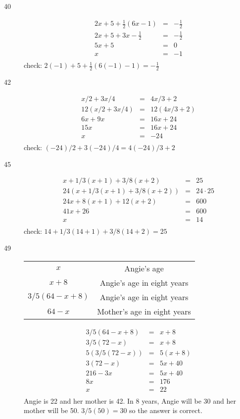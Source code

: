 \documentclass{exam}
\begin{document}
\begin{description}
\item[40]
\begin{eqnarray*}
  2x + 5 + \frac{1}{2}(6x - 1) & = & -\frac{1}{2} \\
  2x + 5 + 3x - \frac{1}{2} & = & -\frac{1}{2} \\
  5x + 5 & = & 0 \\
  x & = & -1 \\
\end{eqnarray*}
check: \( 2(-1) + 5 + \frac{1}{2}(6(-1) - 1) = -\frac{1}{2} \)

\item[42]
\begin{eqnarray*}
  x/2 + 3x/4 & = & 4x/3 + 2 \\
  12(x/2 + 3x/4) & = & 12(4x/3 + 2) \\
  6x + 9x & = & 16x + 24 \\
  15x & = & 16x + 24 \\
  x & = & -24 \\
\end{eqnarray*}
check: \( (-24)/2 + 3(-24)/4 = 4(-24)/3 + 2 \)

\item[45]
\begin{eqnarray*}
  x + 1/3(x + 1) + 3/8(x + 2) & = & 25 \\
  24(x + 1/3(x + 1) + 3/8(x + 2)) & = & 24 \cdot 25 \\
  24x + 8(x + 1) + 12(x + 2) & = & 600 \\
  41x + 26 & = & 600 \\
  x & = & 14 \\
\end{eqnarray*}
check: \( 14 + 1/3(14 + 1) + 3/8(14 + 2) = 25 \)

\item[49] 
\begin{tabular}{|c|c|}
\hline
  $x$ & Angie's age \\
  $x + 8$ & Angie's age in eight years \\
  $3/5(64 - x + 8)$ & Angie's age in eight years \\
  $64 - x$ & Mother's age in eight years \\
\hline
\end{tabular}

\begin{eqnarray*}
  3/5(64 - x + 8) & = & x + 8 \\
  3/5(72 - x) & = & x + 8 \\
  5(3/5(72 - x)) & = & 5(x + 8) \\
  3(72 - x) & = & 5x + 40 \\
  216 - 3x & = & 5x + 40 \\
  8x & = & 176 \\
  x & = & 22 \\
\end{eqnarray*}
Angie is 22 and her mother is 42.  In 8 years, Angie will be 30 and her mother will be 50.  \(3/5(50) = 30\) so the answer is correct.


\end{description}
\end{document}
